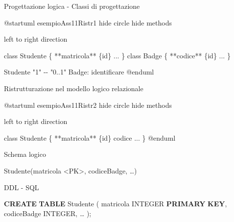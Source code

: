 \documentclass[
]{article}
\newenvironment{Shaded}{}{}
\newcommand{\DataTypeTok}[1]{\textcolor[rgb]{0.56,0.13,0.00}{#1}}
\newcommand{\KeywordTok}[1]{\textcolor[rgb]{0.00,0.44,0.13}{\textbf{#1}}}
\newcommand{\NormalTok}[1]{#1}
\begin{document}
Progettazione logica - Classi di progettazione

\begin{Shaded}
\begin{Highlighting}[]
\NormalTok{@startuml esempioAss11Ristr1}
\NormalTok{hide circle}
\NormalTok{hide methods}

\NormalTok{left to right direction}

\NormalTok{class Studente \{}
\NormalTok{    **matricola** \{id\}}
\NormalTok{    ...}
\NormalTok{\}}
\NormalTok{class Badge \{}
\NormalTok{    **codice** \{id\}}
\NormalTok{    ...}
\NormalTok{\}}

\NormalTok{Studente "1" {-}{-} "0..1" Badge: identificare}
\NormalTok{@enduml}
\end{Highlighting}
\end{Shaded}



Ristrutturazione nel modello logico relazionale

\begin{Shaded}
\begin{Highlighting}[]
\NormalTok{@startuml esempioAss11Ristr2}
\NormalTok{hide circle}
\NormalTok{hide methods}

\NormalTok{left to right direction}

\NormalTok{class Studente \{}
\NormalTok{    **matricola** \{id\}}
\NormalTok{    codice}
\NormalTok{    ...}
\NormalTok{\}}
\NormalTok{@enduml}
\end{Highlighting}
\end{Shaded}



Schema logico

\begin{Shaded}
\begin{Highlighting}[]
\NormalTok{Studente(matricola \textless{}PK\textgreater{}, codiceBadge, …)}
\end{Highlighting}
\end{Shaded}

DDL - SQL

\begin{Shaded}
\begin{Highlighting}[]
\KeywordTok{CREATE} \KeywordTok{TABLE}\NormalTok{ Studente (}
\NormalTok{    matricola }\DataTypeTok{INTEGER} \KeywordTok{PRIMARY} \KeywordTok{KEY}\NormalTok{,}
\NormalTok{    codiceBadge }\DataTypeTok{INTEGER}\NormalTok{,}
\NormalTok{    …}
\NormalTok{);}
\end{Highlighting}
\end{Shaded}
\end{document}

